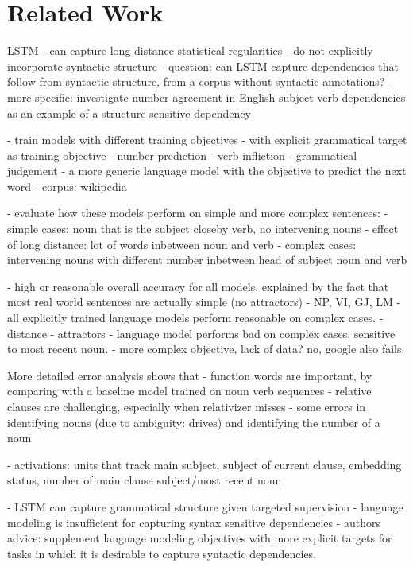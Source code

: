 \section{Related Work}
\label{related work}



LSTM
- can capture long distance statistical regularities
- do not explicitly incorporate syntactic structure
- question: can LSTM capture dependencies that follow from syntactic structure, from a corpus without syntactic annotations?
- more specific: investigate number agreement in English subject-verb dependencies
as an example of a structure sensitive dependency

- train models with different training objectives
  - with explicit grammatical target as training objective
    - number prediction
    - verb infliction
    - grammatical judgement
  - a more generic language model with the objective to predict the next word
- corpus: wikipedia

- evaluate how these models perform on simple and more complex sentences:
  - simple cases: noun that is the subject closeby verb, no intervening nouns
  - effect of long distance: lot of words inbetween noun and verb
  - complex cases: intervening nouns with different number inbetween head of subject noun and verb
  
- high or reasonable overall accuracy for all models, explained by the fact that most real world sentences are actually simple (no attractors)
   - NP, VI, GJ, LM
- all explicitly trained language models perform reasonable on complex cases.
   - distance
   - attractors
- language model performs bad on complex cases. sensitive to most recent noun.
  - more complex objective, lack of data? no, google also fails.

More detailed error analysis shows that
- function words are important, by comparing with a baseline model trained on noun verb sequences
- relative clauses are challenging, especially when relativizer misses
- some errors in identifying nouns (due to ambiguity: drives) and identifying the number of a noun

- activations: units that track main subject, subject of current clause, embedding status, number of main clause subject/most recent noun

- LSTM can capture grammatical structure given targeted supervision
- language modeling is insufficient for capturing syntax sensitive dependencies
- authors advice: supplement language modeling objectives with more explicit targets
for tasks in which it is desirable to capture syntactic dependencies.